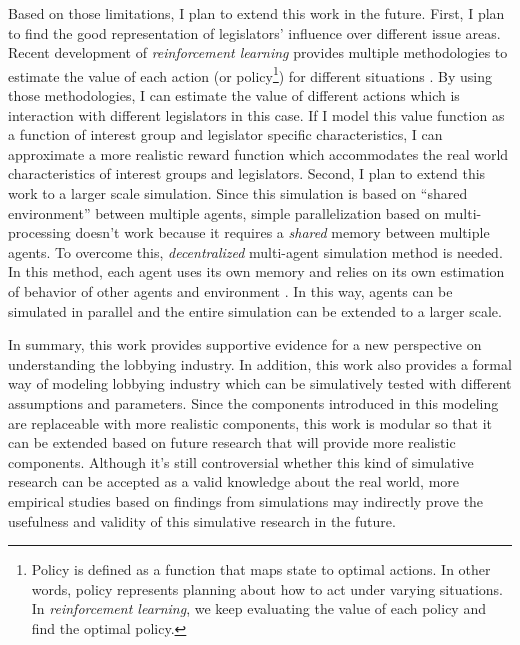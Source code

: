 \documentclass{article}
\begin{document}
Based on those limitations,
I plan to extend this work in the future. 
First, I plan to find the good representation of 
legislators' influence over different issue areas.
Recent development of 
\textit{reinforcement learning} 
provides multiple methodologies to estimate the value of each action (or policy\footnote{Policy is defined as a function that maps state to optimal actions. In other words, policy represents planning about how to act under varying situations. In \textit{reinforcement
 learning}, we keep evaluating the value of each policy and find the optimal policy.
 }) for different situations \citep{Sutton1998}.
By using those methodologies, 
I can estimate the value of different actions which is interaction with different legislators in this case.
If I model this value function 
as a function of interest group and legislator specific characteristics,
I can approximate a more realistic reward function which accommodates the real world characteristics of interest groups and legislators.
Second, I plan to extend this work to a larger scale simulation. 
Since this simulation is based on ``shared environment'' between multiple agents, 
simple parallelization based on multi-processing doesn't work because it requires a \textit{shared} memory between
multiple agents. To overcome this, \textit{decentralized} multi-agent simulation method is needed.
In this method, each agent uses its own memory and relies on its own estimation of behavior of other agents and environment \citep{decen}.
In this way, agents can be simulated in parallel and the entire simulation can be extended to a larger scale.

In summary, this work provides 
supportive evidence for a new perspective on understanding the lobbying industry. 
In addition,
this work also provides a formal way of 
modeling lobbying industry which can be simulatively 
tested with different assumptions and parameters.
Since the components introduced in this modeling 
are replaceable with more realistic components,
this work is modular so that it can be extended based on 
future research that will provide more realistic components.
Although it's still controversial whether this kind of simulative research can 
be accepted as a valid knowledge about the real world,
more empirical studies based on findings from  
simulations may indirectly prove the 
usefulness and validity of this simulative research in the future.
\end{document}
